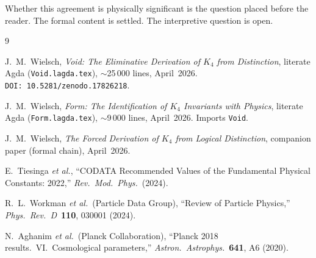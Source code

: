 \documentclass[11pt,a4paper]{article}
\theoremstyle{definition}
\begin{document}
Whether this agreement is physically significant is the question placed before
the reader.  The formal content is settled.  The interpretive question is open.

\begin{thebibliography}{9}

J.~M.~Wielsch,
\textit{Void: The Eliminative Derivation of $K_4$ from Distinction},
literate Agda (\texttt{Void.lagda.tex}), $\sim$25\,000 lines, April~2026.
\texttt{DOI:~10.5281/zenodo.17826218}.

J.~M.~Wielsch,
\textit{Form: The Identification of $K_4$ Invariants with Physics},
literate Agda (\texttt{Form.lagda.tex}), $\sim$9\,000 lines, April~2026.
Imports \texttt{Void}.

J.~M.~Wielsch,
\textit{The Forced Derivation of $K_4$ from Logical Distinction},
companion paper (formal chain), April~2026.

E.~Tiesinga \textit{et al.},
``CODATA Recommended Values of the Fundamental Physical Constants: 2022,''
\textit{Rev.~Mod.~Phys.}\ (2024).

R.~L.~Workman \textit{et al.}\ (Particle Data Group),
``Review of Particle Physics,''
\textit{Phys.~Rev.~D}~\textbf{110}, 030001 (2024).

N.~Aghanim \textit{et al.}\ (Planck Collaboration),
``Planck 2018 results.~VI.~Cosmological parameters,''
\textit{Astron.\ Astrophys.}~\textbf{641}, A6 (2020).

\end{thebibliography}
\end{document}
